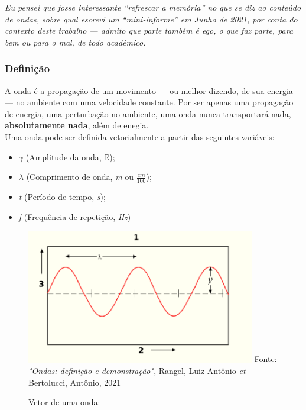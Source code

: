 \documentclass[
  a4paper]{article}
\providecommand{\tightlist}{%
  \setlength{\itemsep}{0pt}\setlength{\parskip}{0pt}}
\begin{document}
\emph{Eu pensei que fosse interessante ``refrescar a memória'' no que se
diz ao conteúdo de ondas, sobre qual escrevi um ``mini-informe'' em
Junho de 2021, por conta do contexto deste trabalho --- admito que parte
também é ego, o que faz parte, para bem ou para o mal, de todo
acadêmico.}

\hypertarget{definiuxe7uxe3o}{%
\subsubsection{Definição}\label{definiuxe7uxe3o}}

A onda é a propagação de um movimento --- ou melhor dizendo, de sua
energia --- no ambiente com uma velocidade constante. Por ser apenas uma
propagação de energia, uma perturbação no ambiente, uma onda nunca
transportará nada, \textbf{absolutamente nada}, além de enegia.\\
Uma onda pode ser definida vetorialmente a partir das seguintes
variáveis:

\begin{itemize}
\tightlist
\item
  \(\gamma\) (Amplitude da onda, \(\mathbb{R}\));
\item
  \(\lambda\) (Comprimento de onda, \emph{m} ou
  \(\frac{\textit{cm}}{100}\));
\item
  \emph{t} (Período de tempo, \emph{s});
\item
  \emph{f} (Frequência de repetição, \emph{Hz})
\end{itemize}

\begin{figure}[!h]
\centering
    \caption{Vetor de uma onda:} 
    \includegraphics[width=100mm]{../_img/fig10.png}
    \linebreak
    Fonte: \textit{"Ondas: definição e demonstração"}, Rangel, Luiz Antônio \textit{et} Bertolucci, Antônio, 2021
\end{figure}
\end{document}
